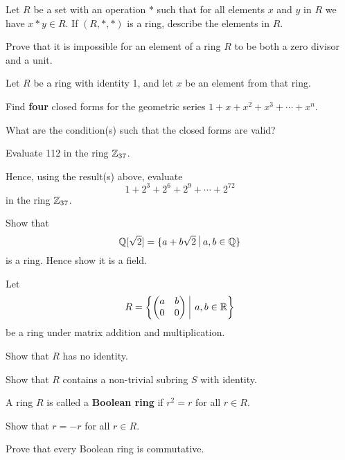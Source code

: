 \begin{problem}
    Let $R$ be a set with an operation $\ast$ such that for all elements $x$ and $y$ in $R$ we have $x \ast y \in R$. If $(R, \ast, \ast)$ is a ring, describe the elements in $R$.
\end{problem}

\begin{problem}
    Prove that it is impossible for an element of a ring $R$ to be both a zero divisor and a unit.
\end{problem}

\begin{problem}
    Let $R$ be a ring with identity 1, and let $x$ be an element from that ring.
    \begin{partquestions}{\roman*}
        \item Find \textbf{four} closed forms for the geometric series $1 + x + x^2 + x^3 + \cdots + x^n$.
        \item What are the condition(s) such that the closed forms are valid?
        \item Evaluate 112 in the ring $\mathbb{Z}_{37}$.
        \item Hence, using the result(s) above, evaluate
        \[
            1 + 2^3 + 2^6 + 2^9 + \cdots + 2^{72}
        \]
        in the ring $\mathbb{Z}_{37}$.
    \end{partquestions}
\end{problem}

\begin{problem}
    Show that
    \[
        \Q[\sqrt2] = \{a + b\sqrt2 \vert a,b \in \Q\}
    \]
    is a ring. Hence show it is a field.
\end{problem}

\begin{problem}
    Let
    \[
        R = \left\{\begin{pmatrix}a&b\\0&0\end{pmatrix} \vert a,b \in \R\right\}    
    \]
    be a ring under matrix addition and multiplication.
    \begin{partquestions}{\roman*}
        \item Show that $R$ has no identity.
        \item Show that $R$ contains a non-trivial subring $S$ with identity.
    \end{partquestions}
\end{problem}

\begin{problem}
    A ring $R$ is called a \textbf{Boolean ring} if $r^2 = r$ for all $r \in R$.
    \begin{partquestions}{\roman*}
        \item Show that $r = -r$ for all $r \in R$.
        \item Prove that every Boolean ring is commutative.
    \end{partquestions}
\end{problem}

